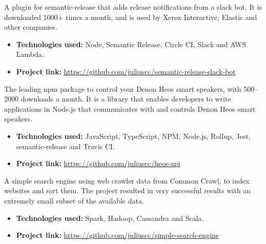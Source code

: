 
A plugin for semantic-release that adds release notifications from a slack bot. It is downloaded 1000+ times a month, and is used by Xerox Interactive, Elastic and other companies.

\vspace{6pt}

\begin{itemize}
    \item \textbf{Technologies used:} Node, Semantic Release, Circle CI, Slack and AWS Lambda.
    \item \textbf{Project link:} \href{https://github.com/juliuscc/semantic-release-slack-bot}{https://github.com/juliuscc/semantic-release-slack-bot}
\end{itemize}

\divider


The leading npm package to control your Denon Heos smart speakers, with 500--2000 downloads a month. It is a library that enables developers to write applications in Node.js that communicates with and controls Denon Heos smart speakers.

\vspace{6pt}

\begin{itemize}
    \item \textbf{Technologies used:} JavaScript, TypeScript, NPM, Node.js, Rollup, Jest, semantic-release and Travis CI.
    \item \textbf{Project link:} \href{https://github.com/juliuscc/heos-api}{https://github.com/juliuscc/heos-api}
\end{itemize}

\divider

A simple search engine using web crawler data from Common Crawl, to index websites and sort them. The project resulted in very successful results with an extremely small subset of the available data.

\vspace{6pt}

\begin{itemize}
    \item \textbf{Technologies used:} Spark, Hadoop, Cassandra and Scala.
    \item \textbf{Project link:} \href{https://github.com/juliuscc/simple-search-engine}{https://github.com/juliuscc/simple-search-engine}
\end{itemize}

